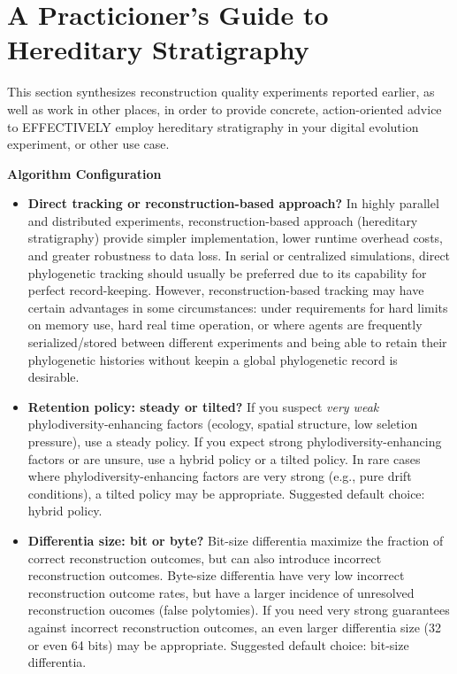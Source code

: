 \section{A Practicioner's Guide to Hereditary Stratigraphy} \label{sec:synthesis}

This section synthesizes reconstruction quality experiments reported earlier, as well as work in other places, in order to provide concrete, action-oriented advice to EFFECTIVELY employ hereditary stratigraphy in your digital evolution experiment, or other use case.

\textbf{Algorithm Configuration}
\begin{itemize}
\item \textbf{Direct tracking or reconstruction-based approach?}
  In highly parallel and distributed experiments, reconstruction-based approach (hereditary stratigraphy) provide simpler implementation, lower runtime overhead costs, and greater robustness to data loss.
  In serial or centralized simulations, direct phylogenetic tracking should usually be preferred due to its capability for perfect record-keeping.
  However, reconstruction-based tracking may have certain advantages in some circumstances: under requirements for hard limits on memory use, hard real time operation, or where agents are frequently serialized/stored between different experiments and being able to retain their phylogenetic histories without keepin a global phylogenetic record is desirable.
\item \textbf{Retention policy: steady or tilted?} 
  If you suspect \textit{very weak} phylodiversity-enhancing factors (ecology, spatial structure, low seletion pressure), use a steady policy.
  If you expect strong phylodiversity-enhancing factors or are unsure, use a hybrid policy or a tilted policy.
  In rare cases where phylodiversity-enhancing factors are very strong (e.g., pure drift conditions), a tilted policy may be appropriate.
  Suggested default choice: hybrid policy.
\item \textbf{Differentia size: bit or byte?}
  Bit-size differentia maximize the fraction of correct reconstruction outcomes, but can also introduce incorrect reconstruction outcomes.
  Byte-size differentia have very low incorrect reconstruction outcome rates, but have a larger incidence of unresolved reconstruction oucomes (false polytomies).
  If you need very strong guarantees against incorrect reconstruction outcomes, an even larger differentia size (32 or even 64 bits) may be appropriate. 
  Suggested default choice: bit-size differentia.

\end{itemize}
